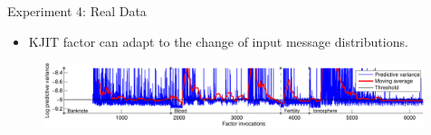 \documentclass[english]{beamer}
\begin{document}
\begin{frame}
\begin{columns}[t]
\begin{block}{ Experiment 4: Real Data}
\begin{figure}[ht]
  \centering
  \label{fig:uci_performance}
\end{figure}

\begin{itemize}
    \item KJIT factor can adapt to the change of input message distributions.
\end{itemize}

\begin{figure}
\centering
\includegraphics[width=0.99\textwidth]{online/uci_temporal_uncertainty-crop}
\end{figure}

\end{block}





\end{columns}
\end{frame}
\end{document}

